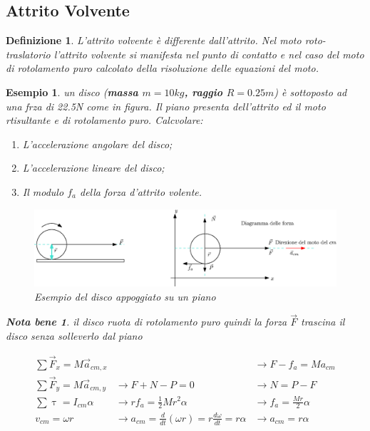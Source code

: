 \documentclass{book}
\newtheorem{notab}{Nota bene}
\newtheorem{defi}{Definizione}
\newtheorem{esempio}{Esempio}
\begin{document}
\subsection{Attrito Volvente}
\begin{defi}
  L'attrito volvente è differente dall'attrito. Nel moto roto-traslatorio l'attrito
  volvente si manifesta nel punto di contatto e nel caso del moto di rotolamento puro
  calcolato della risoluzione delle equazioni del moto.
\end{defi}
\begin{esempio}
  un disco ({\bf massa $m=10kg$, raggio $R=0.25m$}) è sottoposto ad una frza di 22.5N
  come in figura. Il piano presenta dell'attrito ed il moto rtisultante e di rotolamento
  puro. Calcvolare:
  \begin{enumerate}
  \item L'accelerazione angolare del disco;
  \item L'accelerazione lineare del disco;
  \item Il modulo $f_a$ della forza d'attrito volente.
  \end{enumerate}
  \begin{figure}[ht]
    \centering
    \includegraphics[width=12cm]{img/finiti/attrito-volvente.eps}
    \caption{Esempio del disco appoggiato su un piano}
    \label{fig:roto-traslario-es}
  \end{figure}
  \begin{notab}
    il disco ruota di rotolamento puro quindi la forza $\vec{F}$ trascina il disco senza
    solleverlo dal piano 
  \end{notab}
  \begin{eqnarray*}
    \displaystyle\sum \vec{F}_x=M\vec{a}_{cm,x} && \to\boxed{F-f_a=Ma_{cm}}\\
    \displaystyle\sum \vec{F}_y=M\vec{a}_{cm,y} &\to F+N-P=0& \to \boxed{N=P-F}\\
    \displaystyle\sum \uptau = I_{cm}\alpha& \to rf_a=\frac{1}{2}Mr^2\alpha
                                                &\to \boxed{f_a=\frac{Mr}{2}\alpha}\\
    v_{cm}=\omega r&\to a_{cm}=\frac{d}{dt}(\omega r)=r\frac{d\omega}{dt}=r\alpha
                                                &\to \boxed{a_{cm}=r\alpha}

\end{eqnarray*}
\end{esempio}
\end{document}

